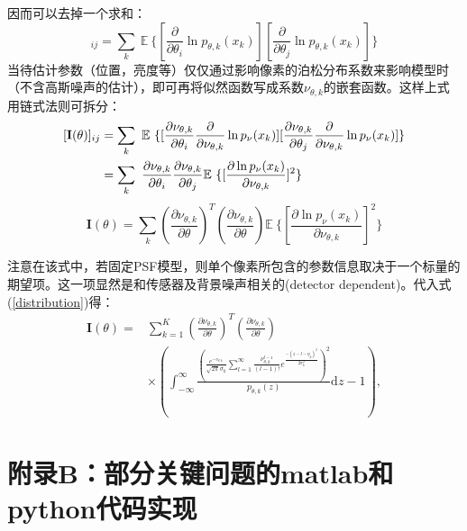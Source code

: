 \documentclass[draft=false,oneside]{fduthesis}
\begin{document}
    因而可以去掉一个求和：
    \begin{equation}
        [\textbf{I}(\theta)]_{ij}=\sum_k \ \mathbb{E}\ \{[\frac{\partial}{\partial\theta_i}\ln p_{\theta, k}(x_k)][\frac{\partial}{\partial\theta_j}\ln p_{\theta, {k}}(x_{k})]\} 
    \end{equation}
    当待估计参数（位置，亮度等）仅仅通过影响像素的泊松分布系数来影响模型时（不含高斯噪声的估计），即可再将似然函数写成系数$\nu_{\theta, k}$的嵌套函数。这样上式用链式法则可拆分：
    \begin{equation}
        \begin{aligned}
            \relax[\textbf{I}(\theta)]_{ij} & =\sum_k \ \mathbb{E}\ \{[\frac{\partial \nu_{\theta, k}}{\partial\theta_i}\frac{\partial }{\partial\nu_{\theta, k}}\ln p_{\nu}(x_k)][\frac{\partial \nu_{\theta, k}}{\partial\theta_j}\frac{\partial }{\partial\nu_{\theta, k}}\ln p_{\nu}(x_k)]\} \\ & =\sum_k \  \frac{\partial \nu_{\theta, k}}{\partial\theta_i}\frac{\partial \nu_{\theta, k}}{\partial\theta_j}\mathbb{E}\  \{[\frac{\partial \ln p_{\nu}(x_k)}{\partial\nu_{\theta, k}}]^2\}
        \end{aligned}
    \end{equation}
    \begin{equation}
        \textbf{I}(\theta)=\sum_k (\frac{\partial \nu_{\theta, k}}{\partial\theta})^T(\frac{\partial \nu_{\theta, k}}{\partial\theta})\mathbb{E}\  \{[\frac{\partial \ln p_{\nu}(x_k)}{\partial\nu_{\theta, k}}]^2\}
    \end{equation}
    \par 注意在该式中，若固定PSF模型，则单个像素所包含的参数信息取决于一个标量的期望项。这一项显然是和传感器及背景噪声相关的(detector dependent)。代入式(\ref{distribution})得：
    \begin{equation}
        \begin{aligned}\mathbf{I}(\theta)= & \sum_{k=1}^{K}\left(\frac{\partial \nu_{\theta, k}}{\partial \theta}\right)^{T}\left(\frac{\partial \nu_{\theta, k}}{\partial \theta}\right) \\& \times\left(\int_{-\infty}^{\infty} \frac{\left(\frac{e^{-v_{\theta, k}}}{\sqrt{2 \pi} \sigma_{k}} \sum_{l=1}^{\infty} \frac{\nu_{\theta, k}^{l-1}}{(l-1)!} e^{\frac{-\left(z-l-\eta_{k}\right)^{2}}{2 \sigma_{k}^{2}}}\right)^{2}}{p_{\theta, k}(z)} \mathrm{d} z-1\right),\end{aligned}
    \end{equation}
    
    \chapter*{附录B：部分关键问题的matlab和python代码实现}
\end{document}
